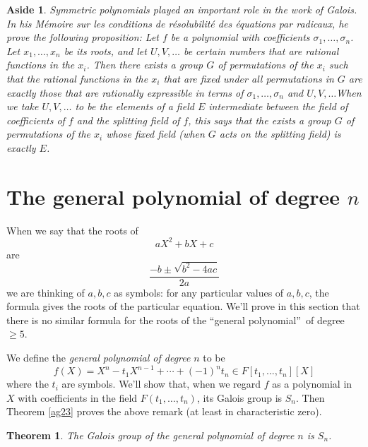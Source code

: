 \documentclass[a4paper,11pt,final,openany]{memoir}
\newtheorem{theorem}[X]{Theorem}
\newtheorem{aside}[X]{Aside}
\theoremstyle{nonumberplain}
\begin{document}
\begin{aside}
\label{ag27b}Symmetric polynomials played an important role in the work of
Galois. In his \textit{M\'{e}moire sur les conditions de r\'{e}solubilit\'{e}
des \'{e}quations par radicaux}, he prove the following proposition:\bquote
Let $f$ be a polynomial with coefficients $\sigma_{1},\ldots,\sigma_{n}$. Let
$x_{1},\ldots,x_{n}$ be its roots, and let $U,V,\ldots$ be certain numbers
that are rational functions in the $x_{i}$. Then there exists a group $G$ of
permutations of the $x_{i}$ such that the rational functions in the $x_{i}$
that are fixed under all permutations in $G$ are exactly those that are
rationally expressible in terms of $\sigma_{1},\ldots,\sigma_{n}$ and
$U,V,\ldots$\equote When we take $U,V,\ldots$ to be the elements of a field
$E$ intermediate between the field of coefficients of $f$ and the splitting
field of $f$, this says that the exists a group $G$ of permutations of the
$x_{i}$ whose fixed field (when $G$ acts on the splitting field) is exactly
$E$.
\end{aside}

\section{The general polynomial of degree \texorpdfstring{$n$}{n}}

When we say that the roots of
\[
aX^{2}+bX+c
\]
are
\[
\frac{-b\pm\sqrt{b^{2}-4ac}}{2a}%
\]
we are thinking of $a,b,c$ as symbols: for any particular values of $a,b,c$,
the formula gives the roots of the particular equation. We'll prove in this
section that there is no similar formula for the roots of the
\textquotedblleft general polynomial\textquotedblright\ of degree $\geq5$.

We define the \emph{general polynomial of degree}%
$n$ to be
\[
f(X)=X^{n}-t_{1}X^{n-1}+\cdots+(-1)^{n}t_{n}\in F[t_{1},...,t_{n}][X]
\]
where the $t_{i}$ are symbols. We'll show that, when we regard $f$ as a
polynomial in $X$ with coefficients in the field $F(t_{1},\ldots,t_{n})$, its
Galois group is $S_{n}$. Then Theorem \ref{ag23} proves the above remark (at
least in characteristic zero).

\begin{theorem}
\label{ag28}The Galois group of the general polynomial of degree $n$ is
$S_{n}$.
\end{theorem}
\end{document}
